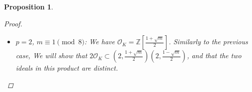 \documentclass[11pt]{article}
\newtheorem{prop}{Proposition}
\theoremstyle{definition}
\begin{document}
\begin{prop}
\begin{proof}
\begin{itemize}
                and that the two ideals in the product are distinct (by symmetry, this will imply that they are both proper ideals).
                For the first part, observe that $2np = p\left(n+\sqrt {m}\right) + p\left(n-\sqrt {m}\right)$
                is in the relevant ideal product. $p\nmid 2n$ so, by the Bezout identity, there exist $a, b \in \mathbb{Z}$ such that
                \[
                    ap + b(2n) = 1 \Rightarrow p = a(p^2) + b(2np) \in \left(p, n + \sqrt {m}\right)\left(p, n - \sqrt {m}\right)
                \]
                To show that the ideals are different, without loss of generality, we will assume $n-\sqrt {m} \in \left(p, n+\sqrt {m}\right)$:
                \begin{gather*}
                    n-\sqrt {m} = p\left(a+b\sqrt {m}\right) + \left(n+\sqrt {m}\right)\left(c+d\sqrt {m}\right) = (ap+cn+dm) + (bp+nd+c)\sqrt {m} \Rightarrow \\
                    bp+nd+c = -1 \\
                    ap+cn+dm = n
                \end{gather*}
                Working modulo $p$, and multiplying the first equation by $n$, we get
                \begin{align*}
                    md + nc &\equiv -n\\
                    cn + dm &\equiv n
                \end{align*}
                Subtracting the first equation from the second, we get $p \mid 2n \Rightarrow p \mid n$, against our assumptions.
                \item $p=2$, $m \equiv 1 \pmod 8$: We have $\mathcal{O}_K = \mathbb{Z}\left[\frac{1+\sqrt {m}}{2}\right]$.
                Similarly to the previous case,
                We will show that
                $2\mathcal{O}_K \subset \left(2, \frac{1 + \sqrt {m}}{2}\right)\left(2, \frac{1 - \sqrt {m}}{2}\right)$,
                and that the two ideals in this product are distinct.
            \end{itemize}


        \end{proof}
    \end{prop}
\end{document}
